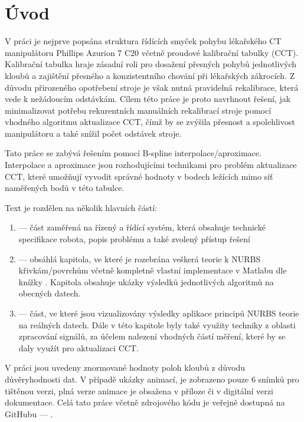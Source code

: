 \section{Úvod}
V práci je nejprve popsána struktura řídících smyček pohybu lékařského CT manipulátoru Phillips Azurion 7 C20
včetně proudové kalibrační tabulky (CCT). Kalibrační tabulka hraje zásadní roli pro dosažení přesných pohybů jednotlivých kloubů a zajištění přesného a konzistentního chování při lékařských zákrocích. Z důvodu přirozeného opotřebení stroje je však nutná pravidelná rekalibrace, která vede k nežádoucím odstávkám. Cílem této práce je proto navrhnout řešení, jak minimalizovat potřebu rekurentních manuálních rekalibrací stroje pomocí vhodného algoritmu aktualizace CCT, čímž by se zvýšila přesnost a spolehlivost manipulátoru a také snížil počet odstávek stroje.
\par
Tato práce se zabývá řešením pomocí B-spline interpolace/aproximace. Interpolace a aproximace jsou rozhodujícími technikami pro problém aktualizace CCT, které umožňují vyvodit správné hodnoty v bodech ležících mimo síť naměřených bodů v této tabulce.\par
Text je rozdělen na několik hlavních částí:
\begin{enumerate}
    \item {} --- část zaměřená na řízený a řídící systém, která obsahuje technické specifikace robota, popis problému a také zvolený přístup řešení
    \item {} --- obsáhlá kapitola, ve které je rozebrána veškerá teorie k NURBS křivkám/povrchům včetně kompletně vlastní implementace v Matlabu dle knížky \cite{The_NURBS_Book}. Kapitola obsahuje ukázky výsledků jednotlivých algoritmů na obecných datech.
    \item {} --- část, ve které jsou vizualizovány výsledky aplikace principů NURBS teorie na reálných datech. Dále v této kapitole byly také využity techniky z oblasti zpracování signálů, za účelem nalezení vhodných částí měření, které by se daly využít pro aktualizaci CCT.
\end{enumerate}
V práci jsou uvedeny znormované hodnoty poloh kloubů z důvodu důvěryhodnosti dat. V případě ukázky animací, je zobrazeno pouze 6 snímků pro tištěnou verzi, plná verze animace je obsažena v příloze či v digitální verzi dokumentace. Celá tato práce včetně zdrojového kódu je veřejně dostupná na GitHubu --- .
